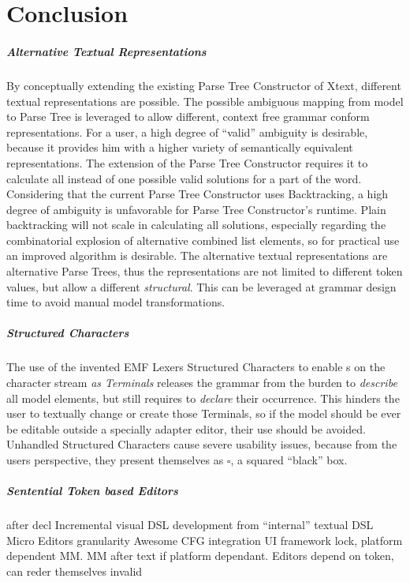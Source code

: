\chapter{Conclusion}
\paragraph{Alternative Textual Representations}
By conceptually extending the existing Parse Tree Constructor of Xtext, different textual representations are possible. The possible ambiguous mapping from model to Parse Tree is leveraged to allow different, context free grammar conform representations. For a user, a high degree of ``valid'' ambiguity is desirable, because it provides him with a higher variety of semantically equivalent representations. The extension of the Parse Tree Constructor requires it to calculate all instead of one possible valid solutions for a part of the word. Considering that the current Parse Tree Constructor uses Backtracking, a high degree of ambiguity is unfavorable for Parse Tree Constructor's runtime. Plain backtracking will not scale in calculating all solutions, especially regarding the combinatorial explosion of alternative combined list elements, so for practical use an improved algorithm is desirable. The alternative textual representations are alternative Parse Trees, thus the representations are not limited to different token values, but allow a different \emph{structural}. This can be leveraged at grammar design time to avoid manual model transformations. 

\paragraph{Structured Characters}
The use of the invented EMF Lexers Structured Characters to enable s on the character stream \emph{as Terminals} releases the grammar from the burden to \emph{describe} all model elements, but still requires to \emph{declare} their occurrence. This hinders the user to textually change or create those  Terminals, so if the model should be ever be editable outside a specially adapter editor, their use should be avoided. Unhandled Structured Characters cause severe usability issues, because from the users perspective, they present themselves as $\square$, a squared ``black'' box.

\paragraph{Sentential Token based Editors}
after decl
Incremental visual DSL development from ``internal'' textual DSL
Micro Editors granularity 
Awesome CFG integration
UI framework lock, platform dependent MM. MM after text if platform dependant.
Editors depend on token, can reder themselves invalid


